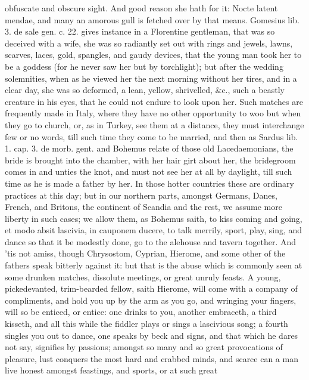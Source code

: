 {obfuscate and obscure sight. And good reason she hath for it: Nocte
latent mendae, and many an amorous gull is fetched over by that means.
Gomesius lib. 3. de sale gen. c. 22. gives instance in a Florentine
gentleman, that was so deceived with a wife, she was so radiantly set
out with rings and jewels, lawns, scarves, laces, gold, spangles, and
gaudy devices, that the young man took her to be a goddess (for he
never saw her but by torchlight); but after the wedding solemnities,
when as he viewed her the next morning without her tires, and in a
clear day, she was so deformed, a lean, yellow, shrivelled, \&c., such a
beastly creature in his eyes, that he could not endure to look upon
her. Such matches are frequently made in Italy, where they have no
other opportunity to woo but when they go to church, or, as in
Turkey, see them at a distance, they must interchange few or no words,
till such time they come to be married, and then as Sardus lib. 1. cap.
3. de morb. gent. and Bohemus relate of those old Lacedaemonians,
the bride is brought into the chamber, with her hair girt about her,
the bridegroom comes in and unties the knot, and must not see her at
all by daylight, till such time as he is made a father by her. In those
hotter countries these are ordinary practices at this day; but in our
northern parts, amongst Germans, Danes, French, and Britons, the
continent of Scandia and the rest, we assume more liberty in such
cases; we allow them, as Bohemus saith, to kiss coming and going, et
modo absit lascivia, in cauponem ducere, to talk merrily, sport, play,
sing, and dance so that it be modestly done, go to the alehouse and
tavern together. And 'tis not amiss, though  Chrysostom, Cyprian,
Hierome, and some other of the fathers speak bitterly against it: but
that is the abuse which is commonly seen at some drunken matches,
dissolute meetings, or great unruly feasts. A young,
pickedevanted, trim-bearded fellow, saith Hierome, will come with a
company of compliments, and hold you up by the arm as you go, and
wringing your fingers, will so be enticed, or entice: one drinks to
you, another embraceth, a third kisseth, and all this while the fiddler
plays or sings a lascivious song; a fourth singles you out to dance,
one speaks by beck and signs, and that which he dares not say,
signifies by passions; amongst so many and so great provocations of
pleasure, lust conquers the most hard and crabbed minds, and scarce can
a man live honest amongst feastings, and sports, or at such great
}
